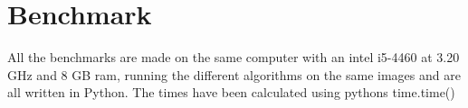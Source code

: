\section{Benchmark}
All the benchmarks are made on the same computer with an intel i5-4460 at 3.20 GHz and 8 GB ram, running the different algorithms on the same images and are all written in Python. The times have been calculated using pythons time.time()
